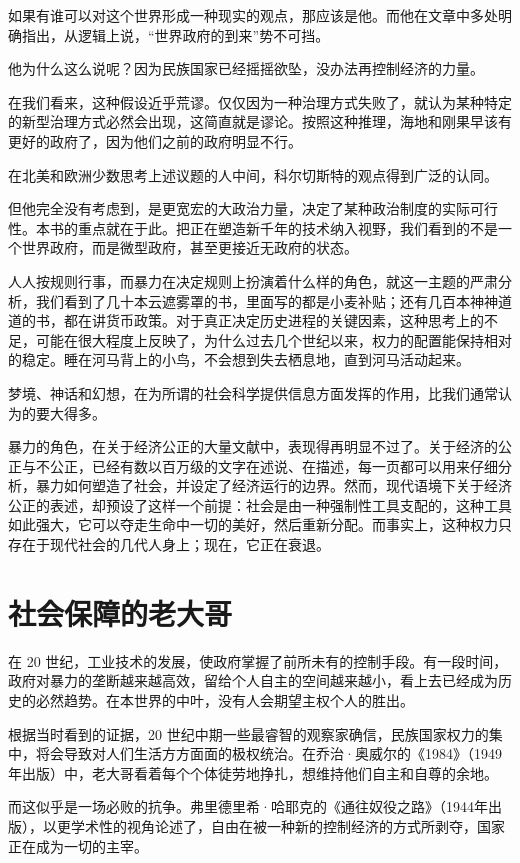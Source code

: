 如果有谁可以对这个世界形成一种现实的观点，那应该是他。而他在文章中多处明确指出，从逻辑上说，“世界政府的到来”势不可挡。


他为什么这么说呢？因为民族国家已经摇摇欲坠，没办法再控制经济的力量。


在我们看来，这种假设近乎荒谬。仅仅因为一种治理方式失败了，就认为某种特定的新型治理方式必然会出现，这简直就是谬论。按照这种推理，海地和刚果早该有更好的政府了，因为他们之前的政府明显不行。


在北美和欧洲少数思考上述议题的人中间，科尔切斯特的观点得到广泛的认同。


但他完全没有考虑到，是更宽宏的大政治力量，决定了某种政治制度的实际可行性。本书的重点就在于此。把正在塑造新千年的技术纳入视野，我们看到的不是一个世界政府，而是微型政府，甚至更接近无政府的状态。


人人按规则行事，而暴力在决定规则上扮演着什么样的角色，就这一主题的严肃分析，我们看到了几十本云遮雾罩的书，里面写的都是小麦补贴；还有几百本神神道道的书，都在讲货币政策。对于真正决定历史进程的关键因素，这种思考上的不足，可能在很大程度上反映了，为什么过去几个世纪以来，权力的配置能保持相对的稳定。睡在河马背上的小鸟，不会想到失去栖息地，直到河马活动起来。


梦境、神话和幻想，在为所谓的社会科学提供信息方面发挥的作用，比我们通常认为的要大得多。


暴力的角色，在关于经济公正的大量文献中，表现得再明显不过了。关于经济的公正与不公正，已经有数以百万级的文字在述说、在描述，每一页都可以用来仔细分析，暴力如何塑造了社会，并设定了经济运行的边界。然而，现代语境下关于经济公正的表述，却预设了这样一个前提：社会是由一种强制性工具支配的，这种工具如此强大，它可以夺走生命中一切的美好，然后重新分配。而事实上，这种权力只存在于现代社会的几代人身上；现在，它正在衰退。


\section{社会保障的老大哥}
在 20 世纪，工业技术的发展，使政府掌握了前所未有的控制手段。有一段时间，政府对暴力的垄断越来越高效，留给个人自主的空间越来越小，看上去已经成为历史的必然趋势。在本世界的中叶，没有人会期望主权个人的胜出。


根据当时看到的证据，20 世纪中期一些最睿智的观察家确信，民族国家权力的集中，将会导致对人们生活方方面面的极权统治。在乔治·奥威尔的《1984》（1949年出版）中，老大哥看着每个个体徒劳地挣扎，想维持他们自主和自尊的余地。


而这似乎是一场必败的抗争。弗里德里希·哈耶克的《通往奴役之路》（1944年出版），以更学术性的视角论述了，自由在被一种新的控制经济的方式所剥夺，国家正在成为一切的主宰。


